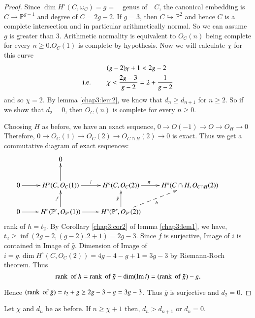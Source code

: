 \begin{proof}
Since $\dim H^\circ(C,\omega_C)=g=\quad\text{genus of}\quad C$, the
canonical embedding is $C\longrightarrow\mathbb{P}^{g-1}$ and degree
of $C=2g-2$. If $g=3$, then $C\hookrightarrow\mathbb{P}^2$ and hence
$C$ is a complete intersection and in particular arithmetically
normal. So we can assume $g$ is greater than $3$. Arithmetic normality
is equivalent to $O_C(n)$ being complete for every $n\geq 0. O_C(1)$
is complete by hypothesis. Now we will calculate $\chi$ for this curve
\begin{align*}
&(g-2)\chi +1<2g-2\\
\text{{i.e.}\kern.3em}\qquad &\chi<\frac{2g-3}{g-2}=2+\frac{1}{g-2}
\end{align*}
and so $\chi=2$. By lemma \ref{chap3:lem2}, we know that $d_n\geq
d_{n+1}$ for $n\geq 2$. So if we show that $d_2=0$, then $O_C(n)$ is
complete for every $n\geq 0$. 

Choosing $H$ as before, we have an exact sequence, $0\longrightarrow
O(-1)\longrightarrow O\longrightarrow O_H\longrightarrow 0$ Therefore,
$0\longrightarrow O_C(1)\longrightarrow O_C(2)\longrightarrow O_{C\cap
  H}(2)\longrightarrow 0$ is exact. Thus we get a commutative diagram
of exact sequences: 
{\fontsize{9}{11}\selectfont
\[
\xymatrix{
& 0 & & & \\
0 \ar[r] & H^\circ(C,O_C(1)) \ar[r]^i \ar[u]& H^\circ(C,O_C(2)) \ar[r]^>>>>>>\pi &
H^\circ(C\cap H,O_{C\cap H}(2))\\
0 \ar[r] & H^\circ(\mathbb{P}^r,O_{\mathbb{P}^r}(1)) \ar[r] \ar[u]^f
& H^\circ(\mathbb{P}^r,O_{\mathbb{P}^r}(2)) \ar[u]^{\bar{g}} \ar @{-->}[ur]_h 
}
\]}\pageoriginale
rank of $h=t_2$. By Corollary \ref{chap3:cor2} of lemma
\ref{chap3:lem1}, we have, $t_2\geq\inf(2g-2,(g-2).2+1)=2g-3$. Since
$f$ is surjective, Image of $i$ is contained in Image of
$\bar{g}$. Dimension of Image of $i=g.\dim
H^\circ(C,O_C(2))=4g-4-g+1=3g-3$ by Riemann-Roch theorem. Thus
$$
\operatorname{rank}\;\text{of} \;h=\operatorname{rank} \;\text{of}\;\bar{g}-\dim (\operatorname{Im} i)=(\operatorname{rank}
\;\text{of}\;\bar{g})-g.
$$

Hence $(\operatorname{rank} \;\text{of}\; \bar{g})=t_2+g\geq 2g-3+g=3g-3$. Thus
$\bar{g}$ is surjective and $d_2=0$.
\end{proof}

\begin{lem}\label{chap3:lem3}
Let $\chi$ and $d_n$ be as before. If $n\geq\chi +1$ then,
$d_n>d_{n+1}$ or $d_n=0$.
\end{lem}

